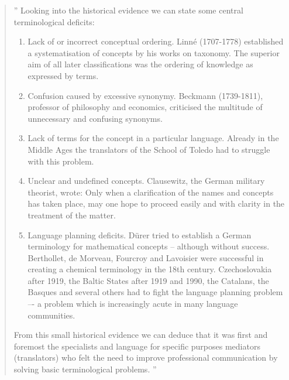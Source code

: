 \documentclass[graybox,envcountchap,sectrefs]{svmono}
\begin{document}
\begin{quote}
''
Looking into the historical evidence we can state some central terminological deficits:
\begin{enumerate}
    \item Lack of or incorrect conceptual ordering. Linn\'{e} (1707-1778) established
a systematisation of concepts by his works on taxonomy. The superior
aim of all later classifications was the ordering of knowledge as expressed
by terms.
    \item Confusion caused by excessive synonymy. Beckmann (1739-1811),
professor of philosophy and economics, criticised the multitude of unnecessary
and confusing synonyms.
    \item Lack of terms for the concept in a particular language. Already in the
Middle Ages the translators of the School of Toledo had to struggle with this problem.
 \item Unclear and undefined concepts. Clausewitz, the German military
theorist, wrote: Only when a clarification of the names and concepts has taken place, may one hope to proceed easily and with clarity in the treatment
of the matter.
 \item Language planning deficits. D\"{u}rer tried to establish a German terminology
for mathematical concepts -- although without success. Berthollet,
de Morveau, Fourcroy and Lavoisier were successful in creating a chemical terminology in the 18th century. Czechoslovakia after 1919, the Baltic States after 1919 and 1990, the Catalans, the Basques and several others had to fight the language planning problem –- a problem which is increasingly acute in many language communities.
\end{enumerate}
From this small historical evidence we can deduce that it was first and
foremost the specialists and language for specific purposes mediators
(translators) who felt the need to improve professional communication
by solving basic terminological problems.
'' \cite{picht2011science}
\end{quote}
\end{document}
